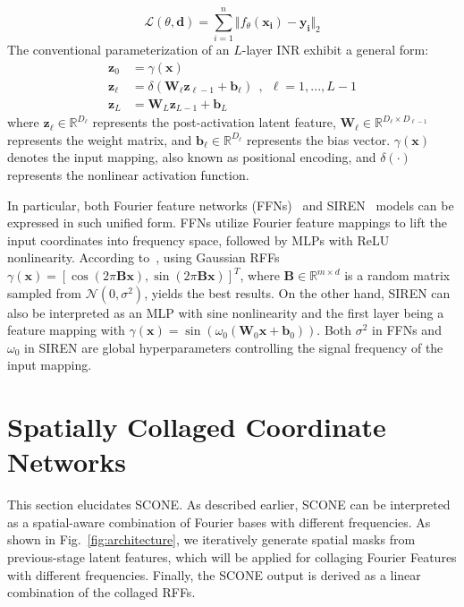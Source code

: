 \documentclass[letterpaper]{article} %
\newcommand{\Lagr}{\mathcal{L}}
\newcommand{\mat}[1]{\bm{#1}}
\begin{document}
\begin{equation}
\Lagr(\theta, \mathbf{d}) =  \sum^{n}_{i=1}\Vert f_\theta(\mathbf{x_i}) - \mathbf{y_i} \Vert_2
\end{equation}%
The conventional parameterization of an $L$-layer INR exhibit a general form:
\begin{equation}
    \begin{aligned}
         \mathbf{z}_{0} &= \gamma(\mathbf{x}) \\
         \mathbf{z}_{\ell} &= \delta(\mat{W}_{\ell} \mathbf{z}_{\ell-1} + \mathbf{b}_{\ell}) \ \ , \ \ \ell = 1, ... , L-1 \\
         \mathbf{z}_{L} &= \mat{W}_{L}\mathbf{z}_{L - 1} +\mathbf{b}_{L}
    \end{aligned}%
\end{equation}%
where $\mathbf{z}_{\ell}\in\mathbb{R}^{D_{\ell}}$ represents the post-activation latent feature, $\mat{W}_{\ell}\in\mathbb{R}^{D_{\ell}\times D_{\ell-1}}$ represents the weight matrix, and $\mathbf{b}_{\ell}\in \mathbb{R}^{D_{\ell}}$ represents the bias vector. $\gamma(\mathbf{x})$ denotes the input mapping, also known as positional encoding, and $\delta(\cdot)$ represents the nonlinear activation function.

In particular, both Fourier feature networks (FFNs)~\cite{tancik2020fourier} and SIREN~\cite{2020siren} models can be expressed in such unified form. FFNs utilize Fourier feature mappings to lift the input coordinates into frequency space, followed by MLPs with ReLU nonlinearity. According to~\cite{tancik2020fourier}, using Gaussian RFFs $\gamma(\mathbf{x}) = [\cos(2\pi\mathbf{Bx}), \sin(2\pi\mathbf{Bx})]^T$, where $\mathbf{B} \in \mathbb{R}^{m \times d}$ is a random matrix sampled from $\mathcal{N}(0, \sigma^2)$, yields the best results. On the other hand, SIREN can also be interpreted as an MLP with sine nonlinearity and the first layer being a feature mapping with $\gamma(\mathbf{x}) = \sin{(\omega_0 (\mat{W}_{0} \mathbf{x} + \mathbf{b}_{0}))}$. Both $\sigma^2$ in FFNs and $\omega_0$ in SIREN are global hyperparameters controlling the signal frequency of the input mapping.

\section{Spatially Collaged Coordinate Networks}
\label{subsec:method_scone}
This section elucidates SCONE. As described earlier, SCONE can be interpreted as a spatial-aware combination of Fourier bases with different frequencies. As shown in Fig.~\ref{fig:architecture}, we iteratively generate spatial masks from previous-stage latent features, which will be applied for collaging Fourier Features with different frequencies. Finally, the SCONE output is derived as a linear combination of the collaged RFFs.
\end{document}
